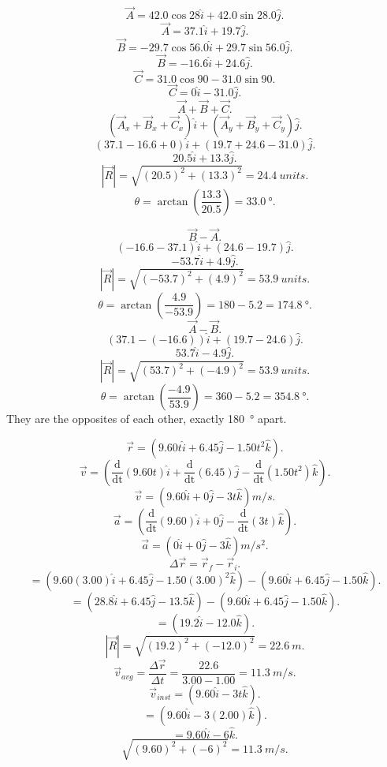 \documentclass[11pt]{homework}
\begin{document}
\setcounter{questionCounter}{9}
\question
\begin{alphaparts}
    \questionpart
    \[
        \vec{A}=42.0 \cos 28\hat{i}+42.0 \sin28.0\hat{j}
    .\] \[
    \vec{A}=37.1\hat{i}+19.7\hat{j}
    .\] \[
    \vec{B}=-29.7\cos56.0\hat{i}+29.7\sin56.0\hat{j}
    .\] \[
    \vec{B}=-16.6\hat{i}+24.6\hat{j}
    .\] \[
    \vec{C}=31.0\cos90-31.0\sin90
    .\] \[
    \vec{C}=0\hat{i}-31.0\hat{j}
    .\] \[
    \vec{A}+\vec{B}+\vec{C}
    .\] \[
    (\vec{A}_x+\vec{B}_x+\vec{C}_x)\hat{i}+(\vec{A}_y+\vec{B}_y+\vec{C}_y)\hat{j}
    .\] \[
    (37.1-16.6+0)\hat{i}+(19.7+24.6-31.0)\hat{j}
    .\] \[
    \boxed{20.5\hat{i}+13.3\hat{j}}
    .\] 
    \questionpart
    \[
        |\vec{R}|=\sqrt{(20.5)^2+(13.3)^2}=\boxed{\qty{24.4}{units}} 
    .\] \[
    \theta = \arctan(\frac{13.3}{20.5})=\boxed{\qty{33.0}{\degree}}
    .\] 
\end{alphaparts}
\question
\begin{alphaparts}
    \questionpart
    \[
        \vec{B}-\vec{A}
    .\] \[
    (-16.6-37.1)\hat{i}+(24.6-19.7)\hat{j}
    .\] \[
    -53.7\hat{i}+4.9\hat{j}
    .\] \[
    |\vec{R}|=\sqrt{(-53.7)^2+(4.9)^2}=\boxed{\qty{53.9}{units}}
    .\] \[
    \theta=\arctan \left(\frac{4.9}{-53.9}\right)=180-5.2=\boxed{\qty{174.8}{\degree}}
    .\] 
    \questionpart
    \[
        \vec{A}-\vec{B}
    .\] \[
    (37.1-(-16.6))\hat{i}+(19.7-24.6)\hat{j}
    .\] \[
    53.7\hat{i}-4.9\hat{j}
    .\] \[
    |\vec{R}|=\sqrt{(53.7)^2+(-4.9)^2}=\boxed{\qty{53.9}{units}}
    .\] \[
    \theta=\arctan \left(\frac{-4.9}{53.9}\right)=360-5.2=\boxed{\qty{354.8}{\degree}}
    .\] 
    \questionpart
They are the opposites of each other, exactly \qty{180}{\degree} apart.
\end{alphaparts}
\setcounter{questionCounter}{18}
\question
\[
    \vec{r}=(9.60t\hat{i}+6.45\hat{j}-1.50t^2\hat{k})
.\] \[
\vec{v}=\left(\frac{\mathrm{d}}{\mathrm{dt}}(9.60t)\hat{i}+\frac{\mathrm{d}}{\mathrm{dt}}(6.45)\hat{j}-\frac{\mathrm{d}}{\mathrm{dt}}(1.50t^2)\hat{k} \right)
.\] \[
\vec{v}=\boxed{(9.60\hat{i}+0\hat{j}-3t\hat{k})\unit{m/s}}
.\] \[
\vec{a}=\left(\frac{\mathrm{d}}{\mathrm{dt}}(9.60)\hat{i}+0\hat{j}-\frac{\mathrm{d}}{\mathrm{dt}}(3t)\hat{k}\right)
.\] \[
\vec{a}=\boxed{(0\hat{i}+0\hat{j}-3\hat{k})\unit{m/s^2}}
.\] 
\question
\[
\Delta \vec{r}=\vec{r}_{f}-\vec{r}_{i}
.\] \[
=(9.60(3.00)\hat{i}+6.45\hat{j}-1.50(3.00)^2\hat{k})-(9.60\hat{i}+6.45\hat{j}-1.50\hat{k})
.\] \[
=(28.8\hat{i}+6.45\hat{j}-13.5\hat{k})-(9.60\hat{i}+6.45\hat{j}-1.50\hat{k})
.\] \[
=(19.2\hat{i}-12.0\hat{k})
.\] \[
|\vec{R}|=\sqrt{(19.2)^2+(-12.0)^2}=\qty{22.6}{m} 
.\] \[
\vec{v}_{avg} =\frac{\Delta \vec{r}}{\Delta t} = \frac{22.6}{3.00-1.00}=\boxed{\qty{11.3}{m/s}}
.\] \[
\vec{v}_{inst}=(9.60\hat{i}-3t\hat{k})
.\] \[
=(9.60\hat{i}-3(2.00)\hat{k})
.\] \[
=9.60\hat{i}-6\hat{k}
.\] \[
\sqrt{(9.60)^2+(-6)^2}=\boxed{\qty{11.3}{m/s}} 
.\] 
\end{document}
